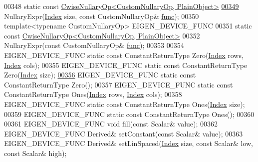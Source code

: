 \begin{DoxyCode}
00348     \textcolor{keyword}{static} \textcolor{keyword}{const} \hyperlink{group___core___module_class_eigen_1_1_cwise_nullary_op}{CwiseNullaryOp<CustomNullaryOp, PlainObject>}
\hyperlink{group___core___module_a3e7f36548fb49d9e9feac8d563af4ccd}{00349}     NullaryExpr(\hyperlink{namespace_eigen_a62e77e0933482dafde8fe197d9a2cfde}{Index} size, \textcolor{keyword}{const} CustomNullaryOp& \hyperlink{structfunc}{func});
00350     \textcolor{keyword}{template}<\textcolor{keyword}{typename} CustomNullaryOp> EIGEN\_DEVICE\_FUNC
00351     \textcolor{keyword}{static} \textcolor{keyword}{const} \hyperlink{group___core___module_class_eigen_1_1_cwise_nullary_op}{CwiseNullaryOp<CustomNullaryOp, PlainObject>}
00352     NullaryExpr(\textcolor{keyword}{const} CustomNullaryOp& \hyperlink{structfunc}{func});
00353 
00354     EIGEN\_DEVICE\_FUNC \textcolor{keyword}{static} \textcolor{keyword}{const} ConstantReturnType Zero(\hyperlink{namespace_eigen_a62e77e0933482dafde8fe197d9a2cfde}{Index} rows, 
      \hyperlink{namespace_eigen_a62e77e0933482dafde8fe197d9a2cfde}{Index} cols);
00355     EIGEN\_DEVICE\_FUNC \textcolor{keyword}{static} \textcolor{keyword}{const} ConstantReturnType Zero(\hyperlink{namespace_eigen_a62e77e0933482dafde8fe197d9a2cfde}{Index} size);
\hyperlink{group___core___module_ac02039681488eb5a6780b7102e01a394}{00356}     EIGEN\_DEVICE\_FUNC \textcolor{keyword}{static} \textcolor{keyword}{const} ConstantReturnType Zero();
00357     EIGEN\_DEVICE\_FUNC \textcolor{keyword}{static} \textcolor{keyword}{const} ConstantReturnType Ones(\hyperlink{namespace_eigen_a62e77e0933482dafde8fe197d9a2cfde}{Index} rows, 
      \hyperlink{namespace_eigen_a62e77e0933482dafde8fe197d9a2cfde}{Index} cols);
00358     EIGEN\_DEVICE\_FUNC \textcolor{keyword}{static} \textcolor{keyword}{const} ConstantReturnType Ones(\hyperlink{namespace_eigen_a62e77e0933482dafde8fe197d9a2cfde}{Index} size);
00359     EIGEN\_DEVICE\_FUNC \textcolor{keyword}{static} \textcolor{keyword}{const} ConstantReturnType Ones();
00360 
00361     EIGEN\_DEVICE\_FUNC \textcolor{keywordtype}{void} fill(\textcolor{keyword}{const} Scalar& value);
00362     EIGEN\_DEVICE\_FUNC Derived& setConstant(\textcolor{keyword}{const} Scalar& value);
00363     EIGEN\_DEVICE\_FUNC Derived& setLinSpaced(\hyperlink{namespace_eigen_a62e77e0933482dafde8fe197d9a2cfde}{Index} size, \textcolor{keyword}{const} Scalar& low, \textcolor{keyword}{const} Scalar& high);

\end{DoxyCode}
